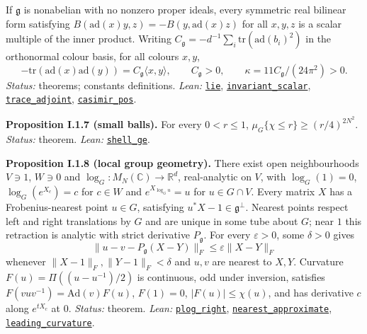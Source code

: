\documentclass[
  letterpaper,
  11pt]{article}
\begin{document}
If \(\mathfrak g\) is nonabelian with no nonzero proper ideals, every
symmetric real bilinear form satisfying
\(B(\mathrm{ad}(x)y,z)=-B(y,\mathrm{ad}(x)z)\) for all \(x,y,z\) is a
scalar multiple of the inner product. Writing
\(C_{\mathfrak g}=-d^{-1}\sum_i\mathrm{tr}(\mathrm{ad}(b_i)^2)\) in the
orthonormal colour basis, for all colours \(x,y\),
\[-\mathrm{tr}(\mathrm{ad}(x)\mathrm{ad}(y))=C_{\mathfrak g}\langle x,y\rangle,\qquad C_{\mathfrak g}>0,\qquad \kappa=11C_{\mathfrak g}/(24\pi^2)>0.\]
\emph{Status:} theorems; constants definitions. \emph{Lean:}
\href{https://github.com/yang-mills-group/OpenAI-YM-20261028/blob/3456e5e75cf8d4cd558955a5c7638fba2d68f464/YM/Gauge/Lie.lean\#L126-L135}{\texttt{lie}},
\href{https://github.com/yang-mills-group/OpenAI-YM-20261028/blob/3456e5e75cf8d4cd558955a5c7638fba2d68f464/YM/Gauge/Casimir.lean\#L99-L125}{\texttt{invariant\_scalar}},
\href{https://github.com/yang-mills-group/OpenAI-YM-20261028/blob/3456e5e75cf8d4cd558955a5c7638fba2d68f464/YM/Gauge/Casimir.lean\#L140-L158}{\texttt{trace\_adjoint}},
\href{https://github.com/yang-mills-group/OpenAI-YM-20261028/blob/3456e5e75cf8d4cd558955a5c7638fba2d68f464/YM/Gauge/Casimir.lean\#L160-L172}{\texttt{casimir\_pos}}.

\textbf{Proposition I.1.7 (small balls).} For every \(0<r\le1\),
\(\mu_G\{\chi\le r\}\ge(r/4)^{2N^2}\). \emph{Status:} theorem.
\emph{Lean:}
\href{https://github.com/yang-mills-group/OpenAI-YM-20261028/blob/3456e5e75cf8d4cd558955a5c7638fba2d68f464/YM/Gauge/Size.lean\#L80-L130}{\texttt{shell\_ge}}.

\textbf{Proposition I.1.8 (local group geometry).} There exist open
neighbourhoods \(V\ni1\), \(W\ni0\) and
\(\log_G:M_N(\mathbb C)\to\mathbb R^d\), real-analytic on \(V\), with
\(\log_G(1)=0\), \(\log_G(e^{X_c})=c\) for \(c\in W\) and
\(e^{X_{\log_Gu}}=u\) for \(u\in G\cap V\). Every matrix \(X\) has a
Frobenius-nearest point \(u\in G\), satisfying
\(u^*X-1\in\mathfrak g^\perp\). Nearest points respect left and right
translations by \(G\) and are unique in some tube about \(G\); near
\(1\) this retraction is analytic with strict derivative
\(P_{\mathfrak g}\). For every \(\varepsilon>0\), some \(\delta>0\)
gives \[\|u-v-P_{\mathfrak g}(X-Y)\|_F\le\varepsilon\|X-Y\|_F\] whenever
\(\|X-1\|_F,\|Y-1\|_F<\delta\) and \(u,v\) are nearest to \(X,Y\).
Curvature \(F(u)=\Pi((u-u^{-1})/2)\) is continuous, odd under inversion,
satisfies \(F(vuv^{-1})=\mathrm{Ad}(v)F(u)\), \(F(1)=0\),
\(|F(u)|\le\chi(u)\), and has derivative \(c\) along \(e^{tX_c}\) at
\(0\). \emph{Status:} theorem. \emph{Lean:}
\href{https://github.com/yang-mills-group/OpenAI-YM-20261028/blob/3456e5e75cf8d4cd558955a5c7638fba2d68f464/YM/Gauge/Chart.lean\#L164-L175}{\texttt{plog\_right}},
\href{https://github.com/yang-mills-group/OpenAI-YM-20261028/blob/3456e5e75cf8d4cd558955a5c7638fba2d68f464/YM/Gauge/Nearest.lean\#L172-L181}{\texttt{nearest\_approximate}},
\href{https://github.com/yang-mills-group/OpenAI-YM-20261028/blob/3456e5e75cf8d4cd558955a5c7638fba2d68f464/YM/Gauge/Curvature.lean\#L78-L96}{\texttt{leading\_curvature}}.
\end{document}
